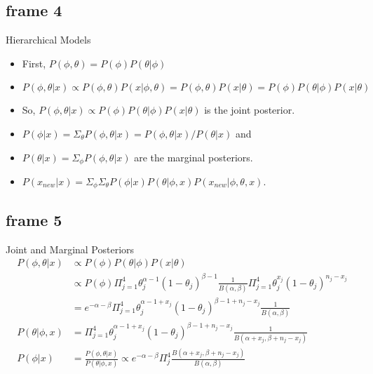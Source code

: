 \documentclass[xcolor=x11names,compress]{beamer}
\renewcommand{\(}{\begin{columns}}
\renewcommand{\)}{\end{columns}}
\newcommand{\<}[1]{\begin{column}{#1}}
\renewcommand{\>}{\end{column}}
\begin{document}
\subsection{frame 4}
\begin{frame}{Hierarchical Models}
\begin{itemize}
\item First, $P(\phi, \theta)=P(\phi)P(\theta | \phi)$
\pause \item $P(\phi, \theta | x) \propto P(\phi, \theta)P(x | \phi, \theta)=P(\phi, \theta)P(x |\theta)=P(\phi)P(\theta | \phi)P(x | \theta)$
\pause \item So, $P(\phi, \theta | x) \propto P(\phi)P(\theta | \phi)P(x | \theta)$ is the joint posterior.
\pause \item[] $P(\phi | x) = \Sigma_\theta P(\phi, \theta | x)=P(\phi, \theta | x)/P(\theta | x)$ and
\item[] $P(\theta | x) = \Sigma_\phi P(\phi, \theta | x)$ are the marginal posteriors.
\pause \item[] $P(x_{new} | x)=\Sigma_\phi \Sigma_\theta P(\phi | x)P(\theta | \phi, x)P(x_{new} | \phi, \theta, x)$.
\end{itemize}
\end{frame}
\subsection{frame 5}
\begin{frame}{Joint and Marginal Posteriors}
\begin{align*}
P(\phi, \theta | x) &\propto P(\phi)P(\theta | \phi)P(x | \theta) \\
&\propto P(\phi)\Pi_{j=1}^4 \theta_{j}^{\alpha -1}(1-\theta_j)^{\beta - 1} \frac{1}{B(\alpha, \beta)}\Pi_{j=1}^4 \theta_{j}^{x_j}(1-\theta_j)^{n_j-x_j} \\
&=e^{-\alpha-\beta}\Pi_{j=1}^4 \theta_{j}^{\alpha -1+x_j}(1-\theta_j)^{\beta - 1+n_j-x_j} \frac{1}{B(\alpha, \beta)} \\
P(\theta | \phi, x) &=\Pi_{j=1}^4 \theta_{j}^{\alpha -1+x_j}(1-\theta_j)^{\beta - 1+n_j-x_j} \frac{1}{B(\alpha + x_j, \beta +n_j - x_j)} \\
P(\phi | x)&=\frac{P(\phi, \theta | x)}{P(\theta | \phi, x)} \propto e^{-\alpha-\beta} \Pi_{j}^4 \frac{B(\alpha + x_j, \beta +n_j - x_j)}{B(\alpha, \beta)}
\end{align*}
\end{frame}
\end{document}

